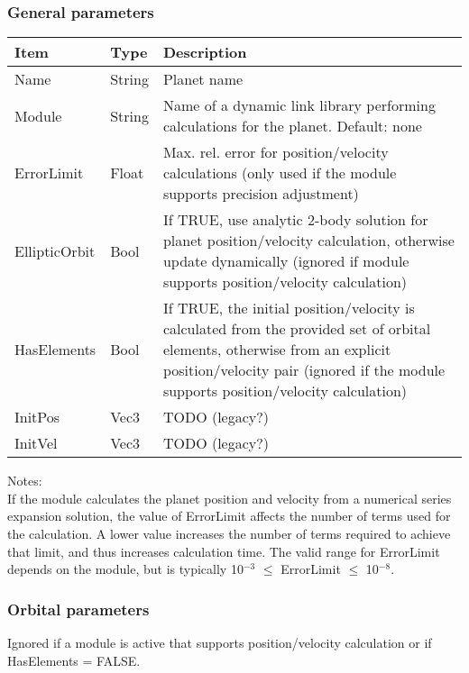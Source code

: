 \documentclass[Orbiter Developer Manual.tex]{subfiles}
\begin{document}
\subsubsection*{General parameters}
	\begin{longtable}{ |p{}|p{}|p{}| }
	\hline\rule{0pt}{2ex}
	\textbf{Item} & \textbf{Type} & \textbf{Description}\\
	\hline\rule{0pt}{2ex}
	Name & String & Planet name\\
	\hline\rule{0pt}{2ex}
	Module & String & Name of a dynamic link library performing calculations for the planet. Default: none\\
	\hline\rule{0pt}{2ex}
	ErrorLimit & Float & Max. rel. error for position/velocity calculations (only used if the module supports precision adjustment)\\
	\hline\rule{0pt}{2ex}
	EllipticOrbit & Bool & If TRUE, use analytic 2-body solution for planet position/velocity calculation, otherwise update dynamically (ignored if module supports position/velocity calculation)\\
	\hline\rule{0pt}{2ex}
	HasElements & Bool & If TRUE, the initial position/velocity is calculated from the provided set of orbital elements, otherwise from an explicit position/velocity pair (ignored if the module supports position/velocity calculation)\\
	\hline\rule{0pt}{2ex}
	InitPos & Vec3 & TODO (legacy?)\\
	\hline\rule{0pt}{2ex}
	InitVel & Vec3 & TODO (legacy?)\\
	\hline
	\end{longtable}

\noindent
Notes:\\
If the module calculates the planet position and velocity from a numerical series expansion solution, the value of ErrorLimit affects the number of terms used for the calculation. A lower value increases the number of terms required to achieve that limit, and thus increases calculation time. The valid range for ErrorLimit depends on the module, but is typically 10$^{-3}$ $\leq$ ErrorLimit $\leq$ 10$^{-8}$.


\subsubsection*{Orbital parameters}
Ignored if a module is active that supports position/velocity calculation or if HasElements = FALSE.
\end{document}
